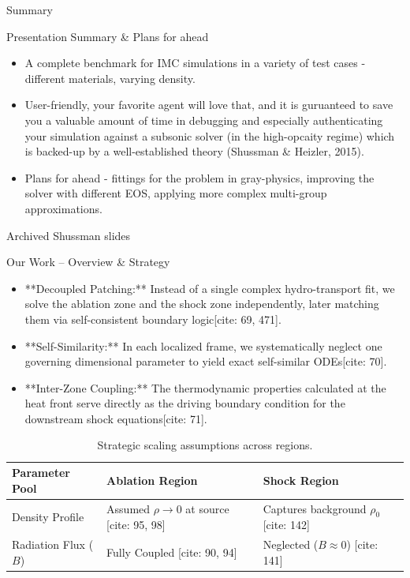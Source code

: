 \documentclass[presentation,10pt]{beamer}
\begin{document}
\begin{frame}{Summary}
  \begin{block}{Presentation Summary \& Plans for ahead}
    \begin{itemize}
      \item A complete benchmark for IMC simulations in a variety of test cases - different materials, varying density.
      \item User-friendly, your favorite agent will love that, and it is guruanteed to save you a valuable amount of time in debugging and especially authenticating your simulation against a subsonic solver (in the high-opcaity regime) which is backed-up by a well-established theory (Shussman \& Heizler, 2015).
      \item Plans for ahead - fittings for the problem in gray-physics, improving the solver with different EOS, applying more complex multi-group approximations.
    \end{itemize}
  \end{block}
\end{frame}

\begin{frame}
  \begin{block}{Archived Shussman slides}
  \end{block}
\end{frame}

\begin{frame}{Our Work -- Overview \& Strategy}
  \begin{itemize}
    \item **Decoupled Patching:** Instead of a single complex hydro-transport fit, we solve the ablation zone and the shock zone independently, later matching them via self-consistent boundary logic[cite: 69, 471].
    \item **Self-Similarity:** In each localized frame, we systematically neglect one governing dimensional parameter to yield exact self-similar ODEs[cite: 70].
    \item **Inter-Zone Coupling:** The thermodynamic properties calculated at the heat front serve directly as the driving boundary condition for the downstream shock equations[cite: 71].
  \end{itemize}

  \begin{table}
    \centering
    \begin{tabular}{lll}
      \toprule
      \textbf{Parameter Pool} & \textbf{Ablation Region} & \textbf{Shock Region} \\
      \midrule
      Density Profile & Assumed $\rho \to 0$ at source [cite: 95, 98] & Captures background $\rho_0$ [cite: 142] \\
      Radiation Flux ($B$) & Fully Coupled [cite: 90, 94] & Neglected ($B \approx 0$) [cite: 141] \\
      \bottomrule
    \end{tabular}
    \caption{Strategic scaling assumptions across regions.}
  \end{table}
\end{frame}
\end{document}
